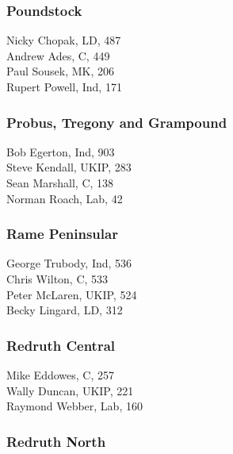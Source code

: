 \documentclass[a4paper,openany,10pt]{book}
\begin{document}
\subsubsection*{Poundstock}



Nicky Chopak, LD, 487\\
Andrew Ades, C, 449\\
Paul Sousek, MK, 206\\
Rupert Powell, Ind, 171\\


\subsubsection*{Probus, Tregony and Grampound}



Bob Egerton, Ind, 903\\
Steve Kendall, UKIP, 283\\
Sean Marshall, C, 138\\
Norman Roach, Lab, 42\\


\subsubsection*{Rame Peninsular}



George Trubody, Ind, 536\\
Chris Wilton, C, 533\\
Peter McLaren, UKIP, 524\\
Becky Lingard, LD, 312\\


\subsubsection*{Redruth Central}



Mike Eddowes, C, 257\\
Wally Duncan, UKIP, 221\\
Raymond Webber, Lab, 160\\


\subsubsection*{Redruth North}
\end{document}
